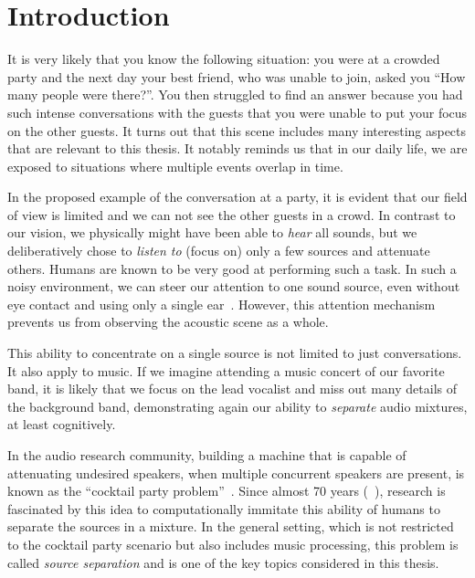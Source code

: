 \chapter{Introduction}\label{ch:introduction}
It is very likely that you know the following situation: you were at a crowded party and the next day your best friend, who was unable to join, asked you ``How many people were there?''.
You then struggled to find an answer because you had such intense conversations with the guests that you were unable to put your focus on the other guests.
It turns out that this scene includes many interesting aspects that are relevant to this thesis. It notably reminds us that in our daily life, we are exposed to situations where multiple events overlap in time.

\par
In the proposed example of the conversation at a party, it is evident that our field of view is limited and we can not see the other guests in a crowd.
In contrast to our vision, we physically might have been able to \emph{hear} all sounds, but we deliberatively chose to \emph{listen to} (focus on) only a few sources and attenuate others.
Humans are known to be very good at performing such a task.
In such a noisy environment, we can steer our attention to one sound source, even without eye contact and using only a single ear~\cite{bregman90}.
However, this attention mechanism prevents us from observing the acoustic scene as a whole.

This ability to concentrate on a single source is not limited to just conversations. It also apply to music.
If we imagine attending a music concert of our favorite band, it is likely that we focus on the lead vocalist and miss out many details of the background band, demonstrating again our ability to \emph{separate} audio mixtures, at least cognitively.

\par
In the audio research community, building a machine that is capable of attenuating undesired speakers, when multiple concurrent speakers are present, is known as the ``cocktail party problem''~\cite{haykin05}.
Since almost 70 years (~\cite{cherry53}), research is fascinated by this idea to computationally immitate this ability of humans to separate the sources in a mixture.
In the general setting, which is not restricted to the cocktail party scenario but also includes music processing, this problem is called \emph{source separation} and is one of the key topics considered in this thesis.

